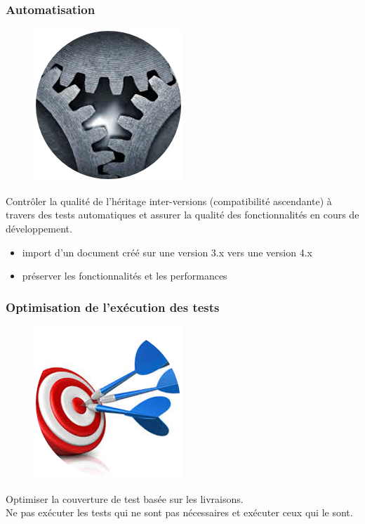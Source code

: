 \subsubsection{Automatisation}
\begin{figure}[H]
  \centering
      \includegraphics{images/automation.png}
\end{figure}
Contrôler la qualité de l'héritage inter-versions (compatibilité ascendante) à travers des tests automatiques et assurer la qualité des fonctionnalités en cours de développement.\\
\begin{itemize}
	\item import d'un document créé sur une version 3.x vers une version 4.x
	\item préserver les fonctionnalités et les performances
\end{itemize}

\subsubsection{Optimisation de l'exécution des tests}
\begin{figure}[H]
  \centering
      \includegraphics{images/produitisation.png}
\end{figure}
Optimiser la couverture de test basée sur les livraisons. \\
Ne pas exécuter les tests qui ne sont pas nécessaires et exécuter ceux qui le sont.

